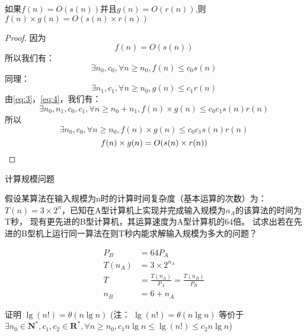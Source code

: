 \documentclass{ctexart}
\begin{document}
\begin{outline}[enumerate]
        \2 如果$f(n)=O(s(n))$并且$g(n)=O(r(n))$,则$f(n)\times g(n)=O(s(n)\times r(n))$
        \begin{proof}
            因为
            \begin{equation*}
                f(n)=O(s(n))
            \end{equation*}
            所以我们有：
            \begin{equation}
                \label{eq:3}
                \exists n_0, c_0, \forall n \geq n_0, f(n) \leq c_0s(n)
            \end{equation}
            同理：
            \begin{equation}
                \label{eq:4}
                \exists n_1, c_1, \forall n \geq n_0, g(n) \leq c_1r(n)
            \end{equation}
            由\cref{eq:3}，\cref{eq:4}，我们有：
            \begin{equation*}
                \exists n_0, n_1, c_0, c_1, \forall n \geq n_0 + n_1, f(n) \times g(n) \leq c_0c_1s(n)r(n)
            \end{equation*}
            所以
            \begin{equation*}
                \exists n_0, c_0, \forall n \geq n_0, f(n) \times g(n) \leq c_0c_1s(n)r(n)
            \end{equation*}
            \begin{equation*}
                f(n) \times g(n) = O(s(n) \times r(n))
                \qedhere
            \end{equation*}
        \end{proof}
    \1 计算规模问题

    假设某算法在输入规模为n时的计算时间复杂度（基本运算的次数）为：
    $T(n)=3\times2^n$，已知在A型计算机上实现并完成输入规模为$n_A$的该算法的时间为T秒，
    现有更先进的B型计算机，其运算速度为A型计算机的64倍。
    试求出若在先进的B型机上运行同一算法在则T秒内能求解输入规模为多大的问题？

    \begin{align*}
        P_B & = 64P_A \\
        T(n_A) & = 3 \times 2^{n_A} \\
        T &= \frac{T(n_A)}{P_A} = \frac{T(n_B)}{P_B} \\
        n_B &= 6+n_A
    \end{align*}

    \1 证明 $\lg(n!) = \theta(n\lg n)$ 
    (注： $\lg(n!) = \theta(n\lg n)$ 等价于 
    $\exists n_0 \in \mathbf{N}^*,c_1,c_2 \in \mathbf{R}^*,  \forall n \geq n_0, 
    c_1 n \lg n \leq \lg(n!) \leq c_2 n \lg n$)


\end{outline}
\end{document}
